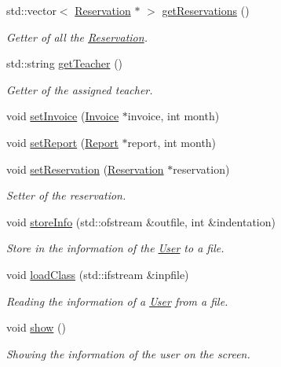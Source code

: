 \begin{DoxyCompactItemize}
std\+::vector$<$ \mbox{\hyperlink{class_reservation}{Reservation}} $\ast$ $>$ \mbox{\hyperlink{class_user_a7443c5c7b1cca31c8400130568050327}{get\+Reservations}} ()
\begin{DoxyCompactList}\small\item\em Getter of all the \mbox{\hyperlink{class_reservation}{Reservation}}. \end{DoxyCompactList}\item 
std\+::string \mbox{\hyperlink{class_user_ac9fcbd4f944689de5faf746aa277d81a}{get\+Teacher}} ()
\begin{DoxyCompactList}\small\item\em Getter of the assigned teacher. \end{DoxyCompactList}\item 
void \mbox{\hyperlink{class_user_ad0432b83c7379ca57ed782d2929f3b8a}{set\+Invoice}} (\mbox{\hyperlink{class_invoice}{Invoice}} $\ast$invoice, int month)
\item 
void \mbox{\hyperlink{class_user_a0cdc359989bc67c3a135737cf1232a49}{set\+Report}} (\mbox{\hyperlink{class_report}{Report}} $\ast$report, int month)
\item 
void \mbox{\hyperlink{class_user_ab0e9dba3828977748ad6316eb346a854}{set\+Reservation}} (\mbox{\hyperlink{class_reservation}{Reservation}} $\ast$reservation)
\begin{DoxyCompactList}\small\item\em Setter of the reservation. \end{DoxyCompactList}\item 
void \mbox{\hyperlink{class_user_aac5ff0f6899f3ce56d1b2d12ed557c79}{store\+Info}} (std\+::ofstream \&outfile, int \&indentation)
\begin{DoxyCompactList}\small\item\em Store in the information of the \mbox{\hyperlink{class_user}{User}} to a file. \end{DoxyCompactList}\item 
void \mbox{\hyperlink{class_user_abc12a9ca668bd860a3d6d2ae4791997d}{load\+Class}} (std\+::ifstream \&inpfile)
\begin{DoxyCompactList}\small\item\em Reading the information of a \mbox{\hyperlink{class_user}{User}} from a file. \end{DoxyCompactList}\item 
void \mbox{\hyperlink{class_user_ac8a201055d02b313721e56c4c0f6af82}{show}} ()
\begin{DoxyCompactList}\small\item\em Showing the information of the user on the screen. \end{DoxyCompactList}\end{DoxyCompactItemize}


